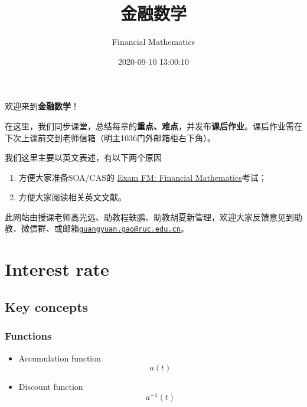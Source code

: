 \documentclass[
]{book}
\title{金融数学}
\author{Financial Mathematics}
\date{2020-09-10 13:00:10}
\begin{document}
\maketitle

{
\setcounter{tocdepth}{1}
\tableofcontents
}
\hypertarget{section}{%
\chapter*{}\label{section}}

欢迎来到\textbf{金融数学}！

在这里，我们同步课堂，总结每章的\textbf{重点、难点}，并发布\textbf{课后作业}。课后作业需在下次上课前交到老师信箱（明主1036门外邮箱柜右下角）。

我们这里主要以英文表述，有以下两个原因

\begin{enumerate}
\def\labelenumi{\arabic{enumi}.}
\item
  方便大家准备SOA/CAS的 \href{https://www.soa.org/education/exam-req/edu-exam-fm-detail/}{Exam FM: Financial Mathematics}考试；
\item
  方便大家阅读相关英文文献。
\end{enumerate}

此网站由授课老师高光远、助教程轶鹏、助教胡夏新管理，欢迎大家反馈意见到助教、微信群、或邮箱\href{mailto:guangyuan.gao@ruc.edu.cn}{\nolinkurl{guangyuan.gao@ruc.edu.cn}}。

\hypertarget{interest-rate}{%
\chapter{Interest rate}\label{interest-rate}}

\hypertarget{key-concepts}{%
\section{Key concepts}\label{key-concepts}}

\hypertarget{functions}{%
\subsection*{Functions}\label{functions}}

\begin{itemize}
\item
  Accumulation function \[a(t)\]
\item
  Discount function \[a^{-1}(t)\]
\end{itemize}
\end{document}
